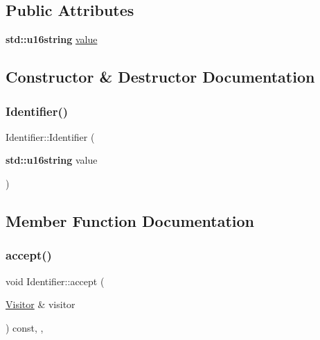 \subsection*{Public Attributes}
\begin{DoxyCompactItemize}
\item 
\textbf{ std\+::u16string} \hyperlink{struct_identifier_a1deb747305d88d9ccac5137a65838d63}{value}
\end{DoxyCompactItemize}


\subsection{Constructor \& Destructor Documentation}
\mbox{\label{struct_identifier_a7b446d6b561512e0ee273f29b1e95581}} 
\subsubsection{\texorpdfstring{Identifier()}{Identifier()}}
{\footnotesize\ttfamily Identifier\+::\+Identifier (\begin{DoxyParamCaption}\item[{\textbf{ std\+::u16string}}]{value }\end{DoxyParamCaption})\hspace{0.3cm}{\ttfamily [inline]}}



\subsection{Member Function Documentation}
\mbox{\label{struct_identifier_acc1d00e56e626c8398b4e995578d6769}} 
\subsubsection{\texorpdfstring{accept()}{accept()}}
{\footnotesize\ttfamily void Identifier\+::accept (\begin{DoxyParamCaption}\item[{\hyperlink{struct_visitor}{Visitor} \&}]{visitor }\end{DoxyParamCaption}) const\hspace{0.3cm}{\ttfamily [inline]}, {\ttfamily [override]}, {\ttfamily [virtual]}}



